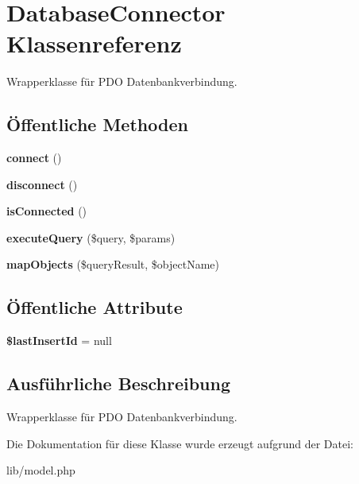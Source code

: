 \hypertarget{classDatabaseConnector}{\section{\-Database\-Connector \-Klassenreferenz}
\label{classDatabaseConnector}
}


\-Wrapperklasse für \-P\-D\-O \-Datenbankverbindung.  


\subsection*{Öffentliche \-Methoden}
\begin{DoxyCompactItemize}
\item 
\hypertarget{classDatabaseConnector_a35b5a0c202be58fb17af638611fb4dc9}{{\bfseries connect} ()}\label{classDatabaseConnector_a35b5a0c202be58fb17af638611fb4dc9}

\item 
\hypertarget{classDatabaseConnector_a7adf5547e1312d72b3644aa69986a743}{{\bfseries disconnect} ()}\label{classDatabaseConnector_a7adf5547e1312d72b3644aa69986a743}

\item 
\hypertarget{classDatabaseConnector_a30417e69e7374ecb284861dc304624bd}{{\bfseries is\-Connected} ()}\label{classDatabaseConnector_a30417e69e7374ecb284861dc304624bd}

\item 
\hypertarget{classDatabaseConnector_a3c9e52fd01af60e5131a9b2d97686519}{{\bfseries execute\-Query} (\$query, \$params)}\label{classDatabaseConnector_a3c9e52fd01af60e5131a9b2d97686519}

\item 
\hypertarget{classDatabaseConnector_a6952aca4ae6a237b347f2d66e439749c}{{\bfseries map\-Objects} (\$query\-Result, \$object\-Name)}\label{classDatabaseConnector_a6952aca4ae6a237b347f2d66e439749c}

\end{DoxyCompactItemize}
\subsection*{Öffentliche \-Attribute}
\begin{DoxyCompactItemize}
\item 
\hypertarget{classDatabaseConnector_a157b8009104ee88b2188d2034382c189}{{\bfseries \$last\-Insert\-Id} = null}\label{classDatabaseConnector_a157b8009104ee88b2188d2034382c189}

\end{DoxyCompactItemize}


\subsection{\-Ausführliche \-Beschreibung}
\-Wrapperklasse für \-P\-D\-O \-Datenbankverbindung. 

\-Die \-Dokumentation für diese \-Klasse wurde erzeugt aufgrund der \-Datei\-:\begin{DoxyCompactItemize}
\item 
lib/model.\-php\end{DoxyCompactItemize}
